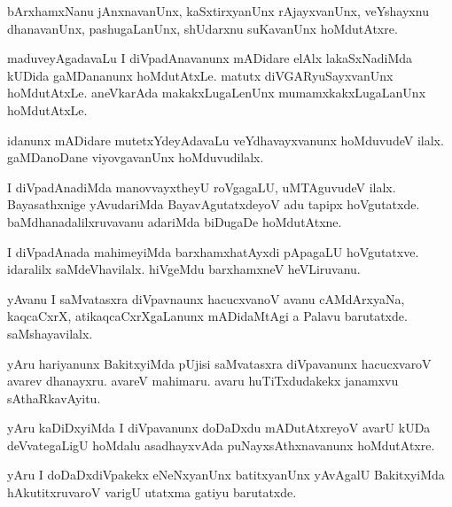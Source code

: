 \documentclass{article}
\begin{document}
\begin{mn}%
bArxhamxNanu jAnxnavanUnx, kaSxtirxyanUnx rAjayxvanUnx, veYshayxnu dhanavanUnx, pashugaLanUnx, 
shUdarxnu suKavanUnx hoMdutAtxre.
\end{mn}

\begin{mn}%
maduveyAgadavaLu I diVpadAnavanunx mADidare elAlx lakaSxNadiMda kUDida gaMDananunx hoMdutAtxLe. 
matutx diVGARyuSayxvanUnx hoMdutAtxLe. aneVkarAda makakxLugaLenUnx mumamxkakxLugaLanUnx hoMdutAtxLe.
\end{mn}

\begin{mn}%
idanunx mADidare mutetxYdeyAdavaLu veYdhavayxvanunx hoMduvudeV ilalx. gaMDanoDane viyovgavanUnx 
hoMduvudilalx.
\end{mn}

\begin{mn}%
I diVpadAnadiMda manovvayxtheyU roVgagaLU, uMTAguvudeV ilalx. Bayasathxnige yAvudariMda 
BayavAgutatxdeyoV adu tapipx hoVgutatxde. baMdhanadalilxruvavanu adariMda biDugaDe hoMdutAtxne.
\end{mn}

\begin{mn}%
I diVpadAnada mahimeyiMda barxhamxhatAyxdi pApagaLU hoVgutatxve. idaralilx saMdeVhavilalx. hiVgeMdu 
barxhamxneV heVLiruvanu.
\end{mn}

\begin{mn}%
yAvanu I saMvatasxra diVpavnaunx hacucxvanoV avanu cAMdArxyaNa, kaqcaCxrX, atikaqcaCxrXgaLanunx 
mADidaMtAgi a Palavu barutatxde. saMshayavilalx.
\end{mn}

\begin{mn}%
yAru hariyanunx BakitxyiMda pUjisi saMvatasxra diVpavanunx hacucxvaroV avarev dhanayxru. avareV 
mahimaru. avaru huTiTxdudakekx janamxvu sAthaRkavAyitu.
\end{mn}

\begin{mn}%
yAru kaDiDxyiMda I diVpavanunx doDaDxdu mADutAtxreyoV avarU kUDa deVvategaLigU hoMdalu asadhayxvAda 
puNayxsAthxnavanunx hoMdutAtxre.
\end{mn}

\begin{mn}%
yAru I doDaDxdiVpakekx eNeNxyanUnx batitxyanUnx yAvAgalU BakitxyiMda hAkutitxruvaroV varigU utatxma 
gatiyu barutatxde.
\end{mn}
\end{document}
